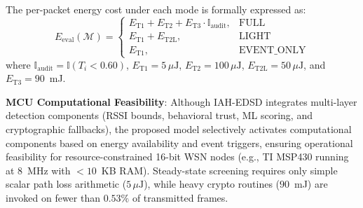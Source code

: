 \documentclass[journal]{IEEEtran}
\begin{document}
The per-packet energy cost under each mode is formally expressed as:
\begin{equation}
E_{\text{eval}}(\mathcal{M}) = \begin{cases}
E_{\text{T1}} + E_{\text{T2}} + E_{\text{T3}} \cdot \mathbb{I}_{\text{audit}}, & \text{FULL} \\
E_{\text{T1}} + E_{\text{T2L}}, & \text{LIGHT} \\
E_{\text{T1}}, & \text{EVENT\_ONLY}
\end{cases}
\end{equation}
where $\mathbb{I}_{\text{audit}} = \mathbb{I}(T_i < 0.60)$, $E_{\text{T1}} = 5\,\mu\text{J}$, $E_{\text{T2}} = 100\,\mu\text{J}$, $E_{\text{T2L}} = 50\,\mu\text{J}$, and $E_{\text{T3}} = 90$~mJ.

\textbf{MCU Computational Feasibility}: Although IAH-EDSD integrates multi-layer detection components (RSSI bounds, behavioral trust, ML scoring, and cryptographic fallbacks), the proposed model selectively activates computational components based on energy availability and event triggers, ensuring operational feasibility for resource-constrained 16-bit WSN nodes (e.g., TI MSP430 running at $8$~MHz with $<10$~KB RAM). Steady-state screening requires only simple scalar path loss arithmetic ($5\,\mu\text{J}$), while heavy crypto routines ($90$~mJ) are invoked on fewer than $0.53\%$ of transmitted frames.
\end{document}
